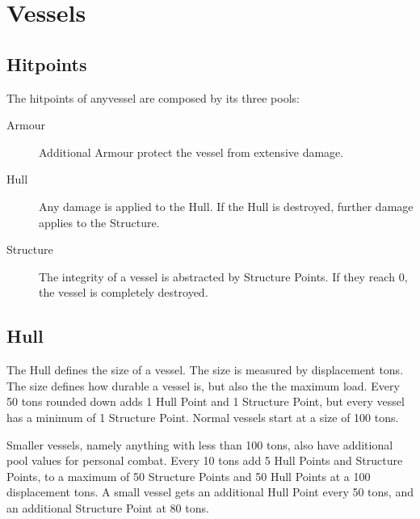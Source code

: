 \chapter{Vessels}
\label{chap:Vessels}

\section{Hitpoints}
\label{sec:Hitpoints}

The hitpoints of anyvessel are composed by its three pools:
\begin{description}
  \item[Armour] Additional Armour protect the vessel from extensive damage.
  \item[Hull] Any damage is applied to the Hull. If the Hull is destroyed, further damage applies to the Structure.
  \item[Structure] The integrity of a vessel is abstracted by Structure Points. If they reach 0, the vessel is completely destroyed.
\end{description}

\section{Hull}
\label{sec:Hull}

The Hull defines the size of a vessel. The size is measured by displacement tons. The size defines how durable a vessel is, but also the the maximum load. Every 50 tons rounded down adds 1 Hull Point and 1 Structure Point, but every vessel has a minimum of 1 Structure Point. Normal vessels start at a size of 100 tons.

Smaller vessels, namely anything with less than 100 tons, also have additional pool values for personal combat. Every 10 tons add 5 Hull Points and Structure Points, to a maximum of 50 Structure Points and 50 Hull Points at a 100 displacement tons.
A small vessel gets an additional Hull Point every 50 tons, and an additional Structure Point at 80 tons.

